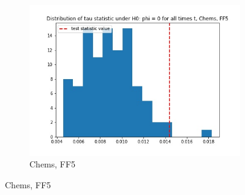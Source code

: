 \documentclass{article}
\begin{document}
\begin{figure}
\begin{subfigure}[b]{0.3\textwidth}
    \includegraphics[width=\textwidth]{Chems/tau_hist_02_FF5.jpg}
    \caption{Chems, FF5}
    \label{fig:2}
  \end{subfigure}
  \end{figure}
 
 \newpage
 
\end{document}

